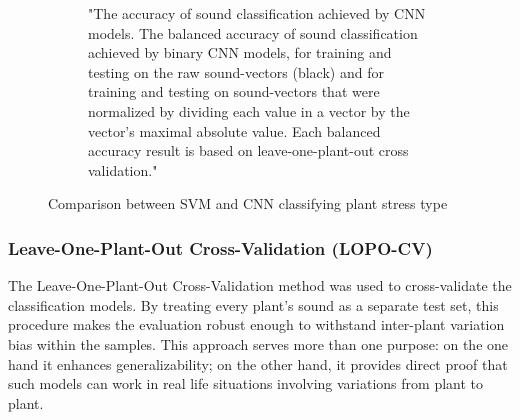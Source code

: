 \begin{figure}[H]
\begin{subfigure}[b]{0.45\textwidth}
    \caption{"The accuracy of sound classification achieved by CNN models. The balanced accuracy of sound classification achieved by binary CNN models, for training and testing on the raw sound-vectors (black) and for training and testing on sound-vectors that were normalized by dividing each value in a vector by the vector’s maximal absolute value. Each balanced accuracy result is based on leave-one-plant-out cross validation." \cite{Cell_Sounds_emitted_by_plants}}
    \label{fig:image2}
  \end{subfigure}
  \caption{Comparison between SVM and CNN classifying plant stress type}
  \label{fig:images}
\end{figure}

\subsubsection{Leave-One-Plant-Out Cross-Validation (LOPO-CV)}
The Leave-One-Plant-Out Cross-Validation method was used to cross-validate the classification models. By treating every plant’s sound as a separate test set, this procedure makes the evaluation robust enough to withstand inter-plant variation bias within the samples. This approach serves more than one purpose: on the one hand it enhances generalizability; on the other hand, it provides direct proof that such models can work in real life situations involving variations from plant to plant.\cite{Cell_Sounds_emitted_by_plants}
